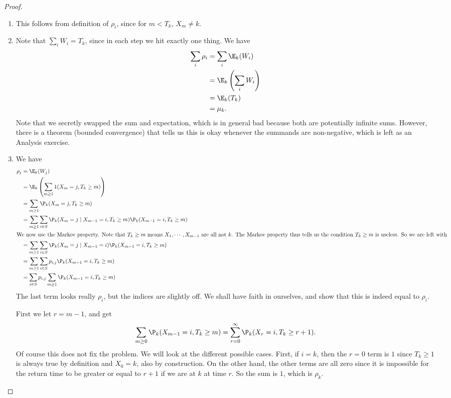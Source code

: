 \documentclass[a4paper]{article}
\begin{document}
\begin{proof}\leavevmode
  \begin{enumerate}
    \item This follows from definition of $\rho_i$, since for $m < T_k$, $X_m \not= k$.
    \item Note that $\sum_i W_i = T_k$, since in each step we hit exactly one thing. We have
      \begin{align*}
        \sum_i \rho_i &= \sum_i \E_k(W_i)\\
        &= \E_k\left(\sum_i W_i\right)\\
        &= \E_k(T_k) \\
        &= \mu_k.
      \end{align*}
      Note that we secretly swapped the sum and expectation, which is in general bad because both are potentially infinite sums. However, there is a theorem (bounded convergence) that tells us this is okay whenever the summands are non-negative, which is left as an Analysis exercise.
    \item We have
      \begin{align*}
        \rho_j &= \E_k(W_j)\\
        &= \E_k\left(\sum_{m \geq 1}1(X_m = j, T_k \geq m)\right) \\
        &= \sum_{m\geq 1}\P_k(X_m = j, T_k \geq m)\\
        &= \sum_{m \geq 1}\sum_{i \in S} \P_k(X_m = j \mid X_{m - 1} = i, T_k \geq m) \P_k(X_{m - 1} = i, T_k \geq m)\\
        \intertext{We now use the Markov property. Note that $T_k \geq m$ means $X_1, \cdots, X_{m - 1}$ are all not $k$. The Markov property thus tells us the condition $T_k \geq m$ is useless. So we are left with}
        &= \sum_{m \geq 1}\sum_{i \in S} \P_k(X_m = j \mid X_{m - 1} = i) \P_k(X_{m - 1} = i, T_k \geq m)\\
        &= \sum_{m \geq 1}\sum_{i \in S} p_{i, j} \P_k(X_{m - 1} = i, T_k \geq m)\\
        &= \sum_{i \in S} p_{i, j} \sum_{m \geq 1} \P_k(X_{m - 1} = i, T_k \geq m)
      \end{align*}
      The last term looks really $\rho_i$, but the indices are slightly off. We shall have faith in ourselves, and show that this is indeed equal to $\rho_i$.

      First we let $r = m - 1$, and get
      \[
        \sum_{m \geq 0} \P_k (X_{m - 1} = i, T_k \geq m) = \sum_{r = 0}^\infty \P_k(X_r = i, T_k \geq r + 1).
      \]
      Of course this does not fix the problem. We will look at the different possible cases. First, if $i = k$, then the $r = 0$ term is $1$ since $T_k \geq 1$ is always true by definition and $X_0 = k$, also by construction. On the other hand, the other terms are all zero since it is impossible for the return time to be greater or equal to $r + 1$ if we are at $k$ at time $r$. So the sum is $1$, which is $\rho_k$.


\end{enumerate}
\end{proof}
\end{document}
